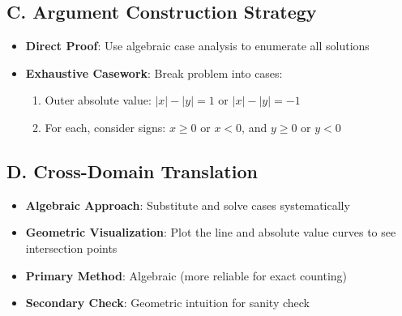 \documentclass[]{article}
\begin{document}
\begin{strategicbox}
\subsection*{C. Argument Construction Strategy}
\begin{itemize}[leftmargin=*]
    \item \textbf{Direct Proof}: Use algebraic case analysis to enumerate all solutions
    \item \textbf{Exhaustive Casework}: Break problem into cases:
    \begin{enumerate}
        \item Outer absolute value: $|x| - |y| = 1$ or $|x| - |y| = -1$
        \item For each, consider signs: $x \geq 0$ or $x < 0$, and $y \geq 0$ or $y < 0$
    \end{enumerate}
\end{itemize}

\subsection*{D. Cross-Domain Translation}
\begin{itemize}[leftmargin=*]
    \item \textbf{Algebraic Approach}: Substitute and solve cases systematically
    \item \textbf{Geometric Visualization}: Plot the line and absolute value curves to see intersection points
    \item \textbf{Primary Method}: Algebraic (more reliable for exact counting)
    \item \textbf{Secondary Check}: Geometric intuition for sanity check
\end{itemize}
\end{strategicbox}
\end{document}
